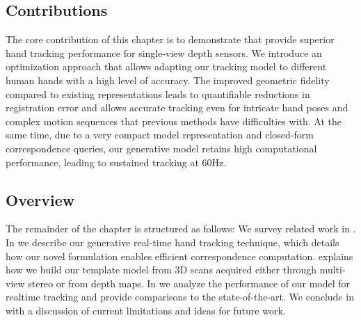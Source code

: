\subsection*{Contributions}
%
The core contribution of this chapter is to demonstrate that  provide superior hand tracking performance for single-view depth sensors. 
We introduce an optimization approach that allows adapting our tracking model to different human hands with a high level of accuracy. 
The improved geometric fidelity compared to existing representations leads to quantifiable reductions in registration error and allows accurate tracking even for intricate hand poses and complex motion sequences that previous methods have difficulties with. 
At the same time, due to a very compact model representation and closed-form correspondence queries, our generative model retains high computational performance, leading to sustained tracking at 60Hz.

\subsection*{Overview}
The remainder of the chapter is structured as follows: We survey related work in . In  we describe our generative real-time hand tracking technique, which details how our novel formulation enables efficient correspondence computation.
% 
 explains how we build our template model from 3D scans acquired either through multi-view stereo or from depth maps.
% 
In  we analyze the performance of our model for realtime tracking and provide comparisons to the state-of-the-art. 
% 
We conclude in  with a discussion of current limitations and ideas for future work.



